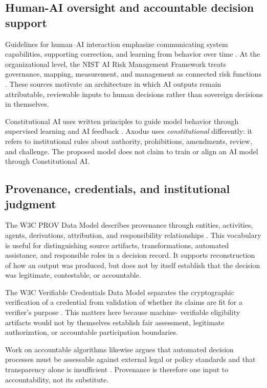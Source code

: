 \documentclass[11pt]{article}
\begin{document}
\begin{landscape}
\subsection{Human-AI oversight and accountable decision support}

Guidelines for human--AI interaction emphasize communicating system
capabilities, supporting correction, and learning from behavior over time
\citep{amershi2019guidelines}. At the organizational level, the NIST AI Risk
Management Framework treats governance, mapping, measurement, and management
as connected risk functions \citep{tabassi2023airmf}. These sources motivate
an architecture in which AI outputs remain attributable, reviewable inputs to
human decisions rather than sovereign decisions in themselves.

Constitutional AI uses written principles to guide model behavior through
supervised learning and AI feedback \citep{bai2022constitutional}. Axodus uses
\emph{constitutional} differently: it refers to institutional rules about
authority, prohibitions, amendments, review, and challenge. The proposed model
does not claim to train or align an AI model through Constitutional AI.

\subsection{Provenance, credentials, and institutional judgment}

The W3C PROV Data Model describes provenance through entities, activities,
agents, derivations, attribution, and responsibility relationships
\citep{w3c2013provdm}. This vocabulary is useful for distinguishing source
artifacts, transformations, automated assistance, and responsible roles in a
decision record. It supports reconstruction of how an output was produced,
but does not by itself establish that the decision was legitimate,
contestable, or accountable.

The W3C Verifiable Credentials Data Model separates the cryptographic
verification of a credential from validation of whether its claims are fit for
a verifier's purpose \citep{w3c2025vcdm}. This matters here because machine-
verifiable eligibility artifacts would not by themselves establish fair
assessment, legitimate authorization, or accountable participation
boundaries.

Work on accountable algorithms likewise argues that automated decision
processes must be assessable against external legal or policy standards and
that transparency alone is insufficient \citep{kroll2017accountable}.
Provenance is therefore one input to accountability, not its substitute.


\end{landscape}
\end{document}
